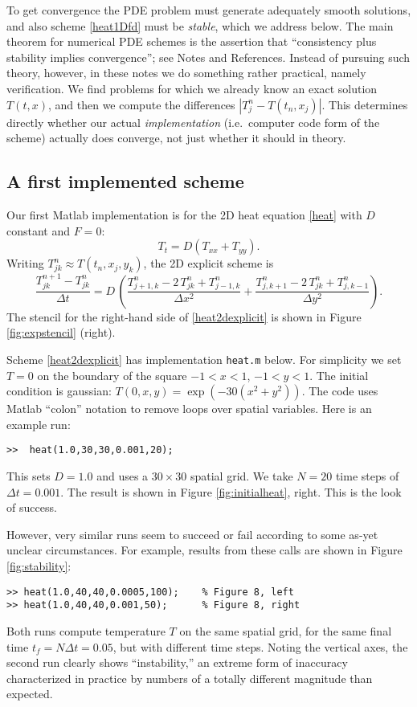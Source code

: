 \documentclass[letterpaper,final,12pt,reqno]{amsart}
\newcommand{\minput}[1]{
\vspace{0.8cm}
\VerbatimInput[frame=single,framesep=3mm,label=\fbox{\normalsize \textsl{\,#1.m\,}},fontfamily=courier,fontsize=\footnotesize]{tmp/#1.slim.m}
\vspace{0.5cm}
}
\begin{document}
To get convergence the PDE problem must generate adequately smooth solutions, and also scheme \eqref{heat1Dfd} must be \emph{stable}, which we address below.  The main theorem for numerical PDE schemes is the assertion that ``consistency plus stability implies convergence''; see Notes and References.  Instead of pursuing such theory, however, in these notes we do something rather practical, namely verification.  We find problems for which we already know an exact solution $T(t,x)$, and then we compute the differences $|T_j^n - T(t_n,x_j)|$.  This determines directly whether our actual \emph{implementation} (i.e.~computer code form of the scheme) actually does converge, not just whether it should in theory.

\subsection*{A first implemented scheme}  Our first Matlab implementation is for the 2D heat equation \eqref{heat} with $D$ constant and $F=0$:
\begin{equation}
T_t = D (T_{xx}+T_{yy}).\label{heat2D}
\end{equation}
Writing $T_{jk}^n \approx T(t_n,x_j,y_k)$, the 2D explicit scheme is
\begin{equation}
	\frac{T_{jk}^{n+1} - T_{jk}^n}{\Delta t} = D\,\left(\frac{T_{j+1,k}^n - 2\, T_{jk}^n + T_{j-1,k}^n}{\Delta x^2} + \frac{T_{j,k+1}^n - 2\, T_{jk}^n + T_{j,k-1}^n}{\Delta y^2}\right). \label{heat2dexplicit}
\end{equation}
The stencil for the right-hand side of \eqref{heat2dexplicit} is shown in Figure \ref{fig:expstencil} (right).

Scheme \eqref{heat2dexplicit} has implementation \texttt{heat.m} below.  For simplicity we set $T=0$ on the boundary of the square $-1 < x < 1$, $-1 < y < 1$.  The initial condition is gaussian: $T(0,x,y) = \exp(-30 (x^2+y^2))$.  The code uses Matlab ``colon'' notation to remove loops over spatial variables.  Here is an example run:
\begin{Verbatim}
>>  heat(1.0,30,30,0.001,20);
\end{Verbatim}
This sets $D=1.0$ and uses a $30\times 30$ spatial grid.  We take $N=20$ time steps of $\Delta t = 0.001$.  The result is shown in Figure \ref{fig:initialheat}, right.  This is the look of success.

\minput{heat}

However, very similar runs seem to succeed or fail according to some as-yet unclear circumstances.  For example, results from these calls are shown in Figure \ref{fig:stability}:
\begin{Verbatim}
>> heat(1.0,40,40,0.0005,100);    % Figure 8, left
>> heat(1.0,40,40,0.001,50);      % Figure 8, right
\end{Verbatim}
Both runs compute temperature $T$ on the same spatial grid, for the same final time $t_f = N \Delta t = 0.05$, but with different time steps.  Noting the vertical axes, the second run clearly shows ``instability,'' an extreme form of inaccuracy characterized in practice by numbers of a totally different magnitude than expected.
\end{document}
